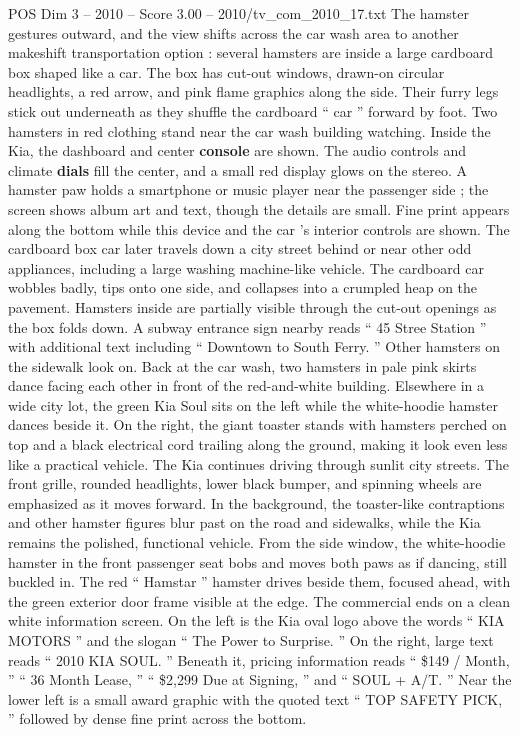 \begin{textsample}{POS Dim 3 – 2010 – Score 3.00 – 2010/tv\_com\_2010\_17.txt}
The hamster gestures outward, and the view shifts across the car wash area to another makeshift transportation option : several hamsters are inside a large cardboard box shaped like a car.
The box has cut-out windows, drawn-on circular headlights, a red arrow, and pink flame graphics along the side.
Their furry legs stick out underneath as they shuffle the cardboard “ car ” forward by foot.
Two hamsters in red clothing stand near the car wash building watching.
Inside the Kia, the dashboard and center \textbf{console} are shown.
The audio controls and climate \textbf{dials} fill the center, and a small red display glows on the stereo.
A hamster paw holds a smartphone or music player near the passenger side ; the screen shows album art and text, though the details are small.
Fine print appears along the bottom while this device and the car ’s interior controls are shown.
The cardboard box car later travels down a city street behind or near other odd appliances, including a large washing machine-like vehicle.
The cardboard car wobbles badly, tips onto one side, and collapses into a crumpled heap on the pavement.
Hamsters inside are partially visible through the cut-out openings as the box folds down.
A subway entrance sign nearby reads “ 45 Stree Station ” with additional text including “ Downtown to South Ferry. ” Other hamsters on the sidewalk look on.
Back at the car wash, two hamsters in pale pink skirts dance facing each other in front of the red-and-white building.
Elsewhere in a wide city lot, the green Kia Soul sits on the left while the white-hoodie hamster dances beside it.
On the right, the giant toaster stands with hamsters perched on top and a black electrical cord trailing along the ground, making it look even less like a practical vehicle.
The Kia continues driving through sunlit city streets.
The front grille, rounded headlights, lower black bumper, and spinning wheels are emphasized as it moves forward.
In the background, the toaster-like contraptions and other hamster figures blur past on the road and sidewalks, while the Kia remains the polished, functional vehicle.
From the side window, the white-hoodie hamster in the front passenger seat bobs and moves both paws as if dancing, still buckled in.
The red “ Hamstar ” hamster drives beside them, focused ahead, with the green exterior door frame visible at the edge.
The commercial ends on a clean white information screen.
On the left is the Kia oval logo above the words “ KIA MOTORS ” and the slogan “ The Power to Surprise. ” On the right, large text reads “ 2010 KIA SOUL. ” Beneath it, pricing information reads “ \$149 / Month, ” “ 36 Month Lease, ” “ \$2,299 Due at Signing, ” and “ SOUL + A/T. ” Near the lower left is a small award graphic with the quoted text “ TOP SAFETY PICK, ” followed by dense fine print across the bottom.

\end{textsample}
